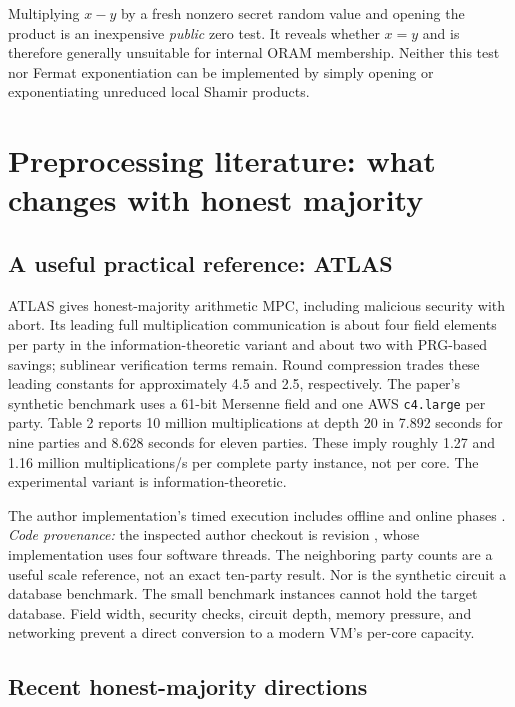 \documentclass[11pt]{article}
\begin{document}
Multiplying $x-y$ by a fresh nonzero secret random value and opening the product
is an inexpensive \emph{public} zero test. It reveals whether $x=y$ and is
therefore generally unsuitable for internal ORAM membership. Neither this test
nor Fermat exponentiation can be implemented by simply opening or exponentiating
unreduced local Shamir products.

\section{Preprocessing literature: what changes with honest majority}\label{sec:literature}

\subsection{A useful practical reference: ATLAS}

ATLAS \cite{atlas2021} gives honest-majority arithmetic MPC, including malicious
security with abort. Its leading full multiplication communication is about
four field elements per party in the information-theoretic variant and about
two with PRG-based savings; sublinear verification terms remain. Round compression
trades these leading constants for approximately 4.5 and 2.5, respectively.
The paper's synthetic benchmark uses a 61-bit Mersenne field and one AWS
\texttt{c4.large} per party. Table 2 reports 10 million multiplications at depth
20 in 7.892 seconds for nine parties and 8.628 seconds for eleven parties.
These imply roughly 1.27 and 1.16 million multiplications/s per complete party
instance, not per core. The experimental variant is information-theoretic.

The author implementation's timed execution includes offline and online phases
\cite{atlascode}.
\emph{Code provenance:} the inspected author checkout is revision
, whose implementation uses four
software threads. The neighboring party counts are a useful scale reference,
not an exact ten-party result. Nor is the synthetic circuit a database benchmark.
The small benchmark instances cannot hold the target database. Field width,
security checks, circuit depth, memory pressure, and networking prevent a direct
conversion to a modern VM's per-core capacity.

\subsection{Recent honest-majority directions}
\end{document}
